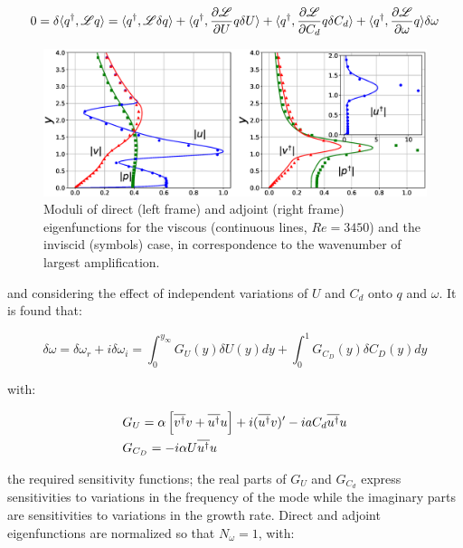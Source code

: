 \begin{equation}
0 = \delta \langle q^{\dagger}, \mathscr{L} q \rangle = 
\langle q^{\dagger}, \mathscr{L} \delta q \rangle +
\langle q^{\dagger}, \dfrac{\partial \mathscr{L}}{\partial U}  q \delta U\rangle +
\langle q^{\dagger}, \dfrac{\partial \mathscr{L}}{\partial C_d}  q \delta C_d\rangle +
\langle q^{\dagger}, \dfrac{\partial \mathscr{L}}{\partial \omega}  q \rangle \delta \omega
\label{eq:lagid}
\end{equation}

\begin{figure}[H]
	\centering
	\includegraphics[width=1\linewidth]{chapter_3/figure/3}
	\caption{Moduli of direct (left frame) and adjoint (right frame) eigenfunctions for the viscous (continuous lines, $Re = 3450$)
		and the inviscid (symbols) case, in correspondence to the wavenumber of largest amplification.}
	\label{fig:3}
\end{figure}

and considering the effect of independent variations of $U$ and $C_d$ onto $q$ and $\omega$. It is found that:

\begin{equation}
\delta \omega =\delta \omega_r + i \delta \omega_i= \int_0^{y_{\infty}}  G_U(y) \delta U(y) dy + \int_0^{1}  G_{C_D}(y) \delta C_D(y) dy
\label{eq:s_omega}
\end{equation}

with:

\begin{equation}
\begin{split}
&G_{U} =  \alpha \left[ \overline{v^{\dagger}} v + \overline{u^{\dagger}} u  \right] +i   (\overline{u^{\dagger}}   v)' -i a C_d \overline{u^{\dagger}}  u \vspace{0.3cm}\\
&G_{C_D} =  - i \alpha  U  \overline{u^{\dagger}} u
\label{eq:GCD}
\end{split}
\end{equation}

the required sensitivity functions; the real parts of $G_U$ and $G_{C_d}$ express sensitivities to variations in
the frequency of the mode while the imaginary parts are sensitivities to variations in the growth rate.
Direct and adjoint eigenfunctions are normalized so that $N_{\omega} = 1$, with:

